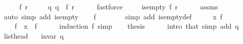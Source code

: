 \begin{isabellebody}
{\isafoldinvisible}%
%
\isadeliminvisible
\isanewline
%
\endisadeliminvisible
%
\isadelimproof
%
\endisadelimproof
%
\isatagproof
{}\isamarkupfalse%
\ {\isacharminus}{\kern0pt}\isanewline
\ \ \isamarkupfalse%
\ f\ r\ \isanewline
\ \ \ \ q{\isacharcolon}{\kern0pt}\ {\isachardoublequoteopen}q\ {\isacharequal}{\kern0pt}\ {\isacharparenleft}{\kern0pt}f{\isacharcomma}{\kern0pt}\ r{\isacharparenright}{\kern0pt}{\isachardoublequoteclose}\isanewline
\ \ \ \ \isamarkupfalse%
\ fastforce\isanewline
\ \ \isamarkupfalse%
\ {\isachardoublequoteopen}{\isasymnot}\ is{\isacharunderscore}{\kern0pt}empty\ {\isacharparenleft}{\kern0pt}f{\isacharcomma}{\kern0pt}\ r{\isacharparenright}{\kern0pt}{\isachardoublequoteclose}\isanewline
\ \ \ \ \isamarkupfalse%
\ assms\isanewline
\ \ \ \ \isamarkupfalse%
\ {\isacharparenleft}{\kern0pt}auto\ simp\ add{\isacharcolon}{\kern0pt}\ is{\isacharunderscore}{\kern0pt}empty{\isacharparenright}{\kern0pt}\isanewline
\ \ \isamarkupfalse%
\ {\isachardoublequoteopen}f\ {\isasymnoteq}\ {\isacharbrackleft}{\kern0pt}{\isacharbrackright}{\kern0pt}{\isachardoublequoteclose}\isanewline
\ \ \ \ \isamarkupfalse%
\ {\isacharparenleft}{\kern0pt}simp\ add{\isacharcolon}{\kern0pt}\ is{\isacharunderscore}{\kern0pt}empty{\isacharunderscore}{\kern0pt}def{\isacharparenright}{\kern0pt}\isanewline
\ \ \isamarkupfalse%
\ \isamarkupfalse%
\ x\ f{\isacharprime}{\kern0pt}\ \isanewline
\ \ \ \ {\isachardoublequoteopen}f\ {\isacharequal}{\kern0pt}\ x\ {\isacharhash}{\kern0pt}\ f{\isacharprime}{\kern0pt}{\isachardoublequoteclose}\isanewline
\ \ \ \ \isamarkupfalse%
\ {\isacharparenleft}{\kern0pt}induction\ f{\isacharparenright}{\kern0pt}\ simp{\isacharplus}{\kern0pt}\isanewline
\ \ \isamarkupfalse%
\ {\isacharquery}{\kern0pt}thesis\isanewline
\ \ \ \ \isamarkupfalse%
\ {\isacharparenleft}{\kern0pt}intro\ that{\isacharparenright}{\kern0pt}\ {\isacharparenleft}{\kern0pt}simp\ add{\isacharcolon}{\kern0pt}\ q{\isacharparenright}{\kern0pt}\isanewline
{}\isamarkupfalse%
%
\endisatagproof
{\isafoldproof}%
%
\isadelimproof
\isanewline
%
\endisadelimproof
%
\isadeliminvisible
\isanewline
%
\endisadeliminvisible
%
\isataginvisible
{}\isamarkupfalse%
\ list{\isacharunderscore}{\kern0pt}head{\isacharcolon}{\kern0pt}\isanewline
\ \ \ {\isachardoublequoteopen}invar\ q{\isachardoublequoteclose}\isanewline

\end{isabellebody}
